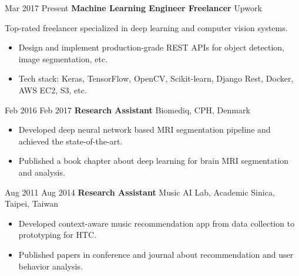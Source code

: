 \documentclass[11pt]{article} %
\begin{document}
{\job
{Mar 2017 }{Present}
{\textbf{Machine Learning Engineer Freelancer}}
{}
{Upwork}
{
	Top-rated freelancer specialized in deep learning and computer vision systems.
		\begin{itemize}[itemsep=0pt]
			\item Design and implement production-grade REST APIs for object detection, image segmentation, etc.
			\item Tech stack: Keras, TensorFlow, OpenCV, Scikit-learn, Django Rest, Docker, AWS EC2, S3, etc.
		\end{itemize}
}


\job
{Feb 2016 }{Feb 2017}
{\textbf{Research Assistant}}
{}
{Biomediq, CPH, Denmark}
{
		\begin{itemize}[itemsep=0pt]
			\item Developed deep neural network based MRI segmentation pipeline and achieved the state-of-the-art.
			\item Published a book chapter about deep learning for brain MRI segmentation and analysis.
		\end{itemize}
}

\job
{Aug 2011 }{Aug 2014}
{\textbf{Research Assistant}}
{}
{Music AI Lab, Academic Sinica, Taipei, Taiwan}
{
		\begin{itemize}[itemsep=0pt]
			\item Developed context-aware music recommendation app from data collection to prototyping for HTC.
			\item Published papers in conference and journal about recommendation and user behavior analysis.
		\end{itemize}	
}
}
\end{document}
